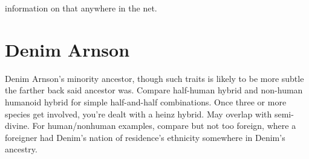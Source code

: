 \documentclass[12pt]{book}
\begin{document}
information on that anywhere in the net.



\chapter{Denim Arnson}

Denim Arnson's minority ancestor, though such traits is likely to be more subtle the farther back said ancestor was. Compare half-human hybrid and non-human humanoid hybrid for simple half-and-half combinations. Once three or more species get involved, you're dealt with a heinz hybrid. May overlap with semi-divine. For human/nonhuman examples, compare but not too foreign, where a foreigner had Denim's nation of residence's ethnicity somewhere in Denim's ancestry.
\end{document}
